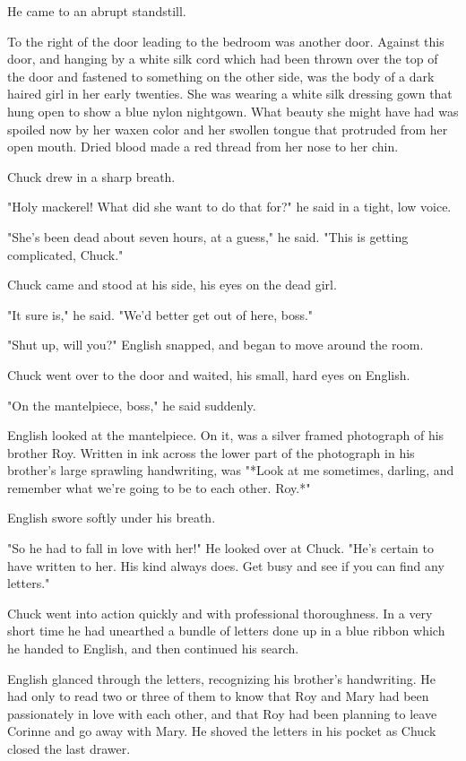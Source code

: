 \documentclass{novel}
\begin{document}
He came to an abrupt standstill.

To the right of the door leading to the bedroom was another door. Against this door, and hanging by a white silk cord which had been thrown over the top of the door and fastened to something on the other side, was the body of a dark haired girl in her early twenties. She was wearing a white silk dressing gown that hung open to show a blue nylon nightgown. What beauty she might have had was spoiled now by her waxen color and her swollen tongue that protruded from her open mouth. Dried blood made a red thread from her nose to her chin.

Chuck drew in a sharp breath.

"Holy mackerel! What did she want to do that for?" he said in a tight, low voice.

"She's been dead about seven hours, at a guess," he said. "This is getting complicated, Chuck."

Chuck came and stood at his side, his eyes on the dead girl.

"It sure is," he said. "We'd better get out of here, boss."

"Shut up, will you?" English snapped, and began to move around the room.

Chuck went over to the door and waited, his small, hard eyes on English.

"On the mantelpiece, boss," he said suddenly.

English looked at the mantelpiece. On it, was a silver framed photograph of his brother Roy. Written in ink across the lower part of the photograph in his brother's large sprawling handwriting, was "*Look at me sometimes, darling, and remember what we're going to be to each other. Roy.*"

English swore softly under his breath.

"So he had to fall in love with her!" He looked over at Chuck. "He's certain to have written to her. His kind always does. Get busy and see if you can find any letters."

Chuck went into action quickly and with professional thoroughness. In a very short time he had unearthed a bundle of letters done up in a blue ribbon which he handed to English, and then continued his search.

English glanced through the letters, recognizing his brother's handwriting. He had only to read two or three of them to know that Roy and Mary had been passionately in love with each other, and that Roy had been planning to leave Corinne and go away with Mary. He shoved the letters in his pocket as Chuck closed the last drawer.
\end{document}
